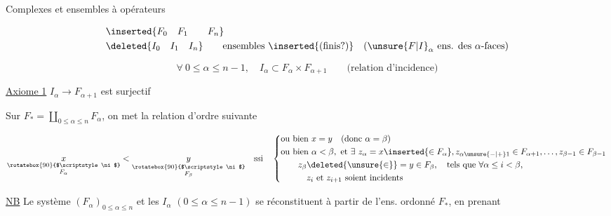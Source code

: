 
Complexes   et ensembles à opérateurs

\[
\begin{aligned}
&\inserted{F_0\quad F_1\qquad F_n}\\
&\deleted{I_0\quad I_1\quad I_n}\qquad\text{ensembles \inserted{(finis?)}}\quad(\unsure{F|I}_\alpha\ \text{ens. des }\alpha\text{-faces})
\end{aligned}
\]

\[
\forall\ 0\leq\alpha\leq n-1,\quad I_\alpha\subset F_\alpha\times F_{\alpha+1}\qquad\text{(relation d'incidence)}
\]

\uline{Axiome 1} \quad $I_\alpha\to F_{\alpha+1}$  est surjectif


Sur $F_*=\displaystyle\coprod_{0\leq\alpha\leq n}F_\alpha$, on met la relation d'ordre suivante

\[
\begin{aligned}
\underset{\substack{\rotatebox{90}{$\scriptstyle\ni$}\\F_\alpha}}{x}
<\underset{\substack{\rotatebox{90}{$\scriptstyle\ni$}\\F_\beta}}{y}
\quad\text{ssi}\quad
\left\{\begin{aligned}
&\text{ou bien }x=y\quad(\text{donc }\alpha=\beta)\\
&\text{ou bien }\alpha<\beta,\ \text{et }\exists\ z_\alpha=x\inserted{\in F_\alpha},z_{\alpha\unsure{-|+}1}\in F_{\alpha+1},\ldots,z_{\beta-1}\in F_{\beta-1}\\
&\hspace{2em} z_\beta\deleted{\unsure{\in}}=y\in F_\beta,\quad\text{tels que }\forall\alpha\leq i<\beta,\\
&\hspace{3em}z_i\ \text{et }z_{i+1}\ \text{soient incidents}
\end{aligned}\right.
\end{aligned}
\]

\uline{NB} Le système $(F_\alpha)_{0\leq\alpha\leq n}$ et les $I_\alpha$ $(0\leq\alpha\leq n-1)$ se réconstituent à partir de l'ens. ordonné $F_*$, en prenant


